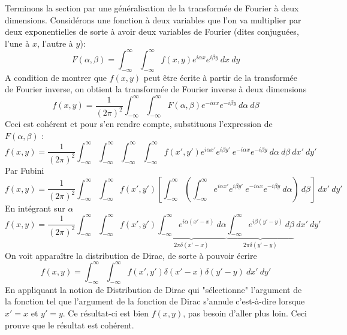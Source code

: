 Terminons la section par une généralisation de la transformée de Fourier à deux dimensions. 
Considérons une fonction à deux variables que l'on va multiplier par deux exponentielles de 
sorte à avoir deux variables de Fourier (dites conjuguées, l'une à $x$, l'autre à $y$):
\begin{equation}
F(\alpha,\beta) = \int_{-\infty}^\infty\int_{-\infty}^\infty f(x,y)e^{i\alpha x}e^{i\beta y}\ 
dx\ dy
\end{equation}
A condition de montrer que $f(x,y)$ peut être écrite à partir de la transformée de Fourier 
inverse, on obtient la transformée de Fourier inverse à deux dimensions
\begin{equation}
f(x,y) = \frac{1}{(2\pi)^2} \int_{-\infty}^\infty\int_{-\infty}^\infty F(\alpha,\beta)
e^{-i\alpha x}e^{-i\beta y}\ d\alpha\ d\beta
\end{equation}
Ceci est cohérent et pour s'en rendre compte, substituons l'expression de $F(\alpha,\beta)$ :
\begin{equation}
f(x,y) = \frac{1}{(2\pi)^2} \int_{-\infty}^\infty\int_{-\infty}^\infty \int_{-\infty}^\infty
\int_{-\infty}^\infty f(x',y')e^{i\alpha x'}e^{i\beta y'}\ e^{-i\alpha x}e^{-i\beta y}\
 d\alpha\ d\beta\ dx'\ dy' 
\end{equation}
Par Fubini
\begin{equation}
f(x,y) = \frac{1}{(2\pi)^2} \int_{-\infty}^\infty\int_{-\infty}^\infty f(x',y') \left[\int_{-\infty}^\infty
\left(\int_{-\infty}^\infty e^{i\alpha x'}e^{i\beta y'}\ e^{-i\alpha x}e^{-i\beta y}\
 d\alpha\right)\ d\beta\right]\ dx'\ dy' 
\end{equation}
En intégrant sur $\alpha$
\begin{equation}
f(x,y) = \frac{1}{(2\pi)^2} \int_{-\infty}^\infty\int_{-\infty}^\infty f(x',y') \underbrace{
\int_{-\infty}^\infty e^{i\alpha(x'-x)}\ d\alpha}_{2\pi\delta(x'-x)} \underbrace{\int_{-\infty}^\infty 
e^{i\beta(y'-y)}\ d\beta}_{2\pi\delta(y'-y)}\ dx'\ dy'
\end{equation}
On voit apparaître la distribution de Dirac, de sorte à pouvoir écrire
\begin{equation}
f(x,y) = \int_{-\infty}^\infty\int_{-\infty}^\infty f(x',y')\delta(x'-x)\delta(y'-y)\ dx'\ dy'
\end{equation}
En appliquant la notion de Distribution de Dirac qui "sélectionne" l'argument de la fonction tel 
que l'argument de la fonction de Dirac s'annule c'est-à-dire lorsque $x'=x$ et $y'=y$. Ce résultat-ci 
est bien $f(x,y)$, pas besoin d'aller plus loin. Ceci prouve que le résultat est cohérent.





